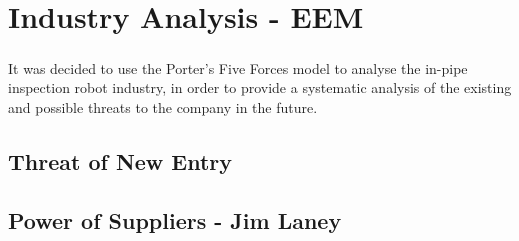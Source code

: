 \documentclass[11pt]{article}		%
\newcommand{\supercite}[1]{\textsuperscript{\cite{#1}}}		%
\begin{document}
	\section{Industry Analysis - EEM}
		
		It was decided to use the Porter's Five Forces model\supercite{porter2008five} to analyse the in-pipe inspection robot industry, in order to provide a systematic analysis of the existing and possible threats to the company in the future.
		
		\subsection[Threat of New Entry]{Threat of New Entry}
				
		\subsection[Power of Suppliers]{Power of Suppliers - Jim Laney}
			
\end{document}
